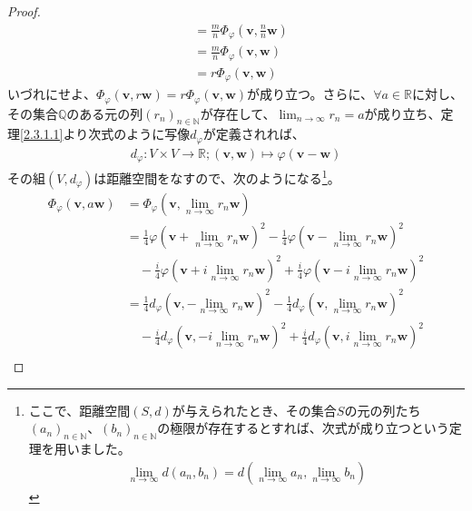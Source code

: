 \documentclass[dvipdfmx]{jsarticle}
\begin{document}
\begin{proof}
\begin{align*}
&= \frac{m}{n}\varPhi_{\varphi}\left( \mathbf{v},\frac{n}{n}\mathbf{w} \right)\\
&= \frac{m}{n}\varPhi_{\varphi}\left( \mathbf{v},\mathbf{w} \right)\\
&= r\varPhi_{\varphi}\left( \mathbf{v},\mathbf{w} \right)
\end{align*}
いづれにせよ、$\varPhi_{\varphi}\left( \mathbf{v},r\mathbf{w} \right) = r\varPhi_{\varphi}\left( \mathbf{v},\mathbf{w} \right)$が成り立つ。さらに、$\forall a \in \mathbb{R}$に対し、その集合$\mathbb{Q}$のある元の列$\left( r_{n} \right)_{n \in \mathbb{N}}$が存在して、$\lim_{n \rightarrow \infty}r_{n} = a$が成り立ち、定理\ref{2.3.1.1}より次式のように写像$d_{\varphi}$が定義されれば、
\begin{align*}
d_{\varphi}:V \times V \rightarrow \mathbb{R};\left( \mathbf{v},\mathbf{w} \right) \mapsto \varphi\left( \mathbf{v} - \mathbf{w} \right)
\end{align*}
その組$\left( V,d_{\varphi} \right)$は距離空間をなすので、次のようになる\footnote{ここで、距離空間$(S,d)$が与えられたとき、その集合$S$の元の列たち$\left( a_{n} \right)_{n \in \mathbb{N}}$、$\left( b_{n} \right)_{n \in \mathbb{N}}$の極限が存在するとすれば、次式が成り立つという定理を用いました。
\begin{align*}
\lim_{n \rightarrow \infty}{d\left( a_{n},b_{n} \right)} = d\left( \lim_{n \rightarrow \infty}a_{n},\lim_{n \rightarrow \infty}b_{n} \right)
\end{align*}}。
\begin{align*}
\varPhi_{\varphi}\left( \mathbf{v},a\mathbf{w} \right) &= \varPhi_{\varphi}\left( \mathbf{v},\lim_{n \rightarrow \infty}r_{n}\mathbf{w} \right)\\
&= \frac{1}{4}{\varphi\left( \mathbf{v} + \lim_{n \rightarrow \infty}r_{n}\mathbf{w} \right)}^{2} - \frac{1}{4}{\varphi\left( \mathbf{v} - \lim_{n \rightarrow \infty}r_{n}\mathbf{w} \right)}^{2} \\
&\quad - \frac{i}{4}{\varphi\left( \mathbf{v} + i\lim_{n \rightarrow \infty}r_{n}\mathbf{w} \right)}^{2} + \frac{i}{4}{\varphi\left( \mathbf{v} - i\lim_{n \rightarrow \infty}r_{n}\mathbf{w} \right)}^{2}\\
&= \frac{1}{4}{d_{\varphi}\left( \mathbf{v}, - \lim_{n \rightarrow \infty}r_{n}\mathbf{w} \right)}^{2} - \frac{1}{4}{d_{\varphi}\left( \mathbf{v},\lim_{n \rightarrow \infty}r_{n}\mathbf{w} \right)}^{2} \\
&\quad - \frac{i}{4}{d_{\varphi}\left( \mathbf{v}, - i\lim_{n \rightarrow \infty}r_{n}\mathbf{w} \right)}^{2} + \frac{i}{4}{d_{\varphi}\left( \mathbf{v},i\lim_{n \rightarrow \infty}r_{n}\mathbf{w} \right)}^{2}\\

\end{align*}
\end{proof}
\end{document}
